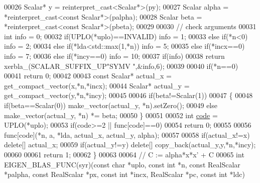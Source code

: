 \begin{DoxyCode}
00026   Scalar* y = \textcolor{keyword}{reinterpret\_cast<}Scalar*\textcolor{keyword}{>}(py);
00027   Scalar alpha  = *\textcolor{keyword}{reinterpret\_cast<}\textcolor{keyword}{const }Scalar*\textcolor{keyword}{>}(palpha);
00028   Scalar beta   = *\textcolor{keyword}{reinterpret\_cast<}\textcolor{keyword}{const }Scalar*\textcolor{keyword}{>}(pbeta);
00029 
00030   \textcolor{comment}{// check arguments}
00031   \textcolor{keywordtype}{int} info = 0;
00032   \textcolor{keywordflow}{if}(UPLO(*uplo)==INVALID)        info = 1;
00033   \textcolor{keywordflow}{else} \textcolor{keywordflow}{if}(*n<0)                   info = 2;
00034   \textcolor{keywordflow}{else} \textcolor{keywordflow}{if}(*lda<std::max(1,*n))    info = 5;
00035   \textcolor{keywordflow}{else} \textcolor{keywordflow}{if}(*incx==0)               info = 7;
00036   \textcolor{keywordflow}{else} \textcolor{keywordflow}{if}(*incy==0)               info = 10;
00037   \textcolor{keywordflow}{if}(info)
00038     \textcolor{keywordflow}{return} xerbla\_(SCALAR\_SUFFIX\_UP\textcolor{stringliteral}{"SYMV "},&info,6);
00039 
00040   \textcolor{keywordflow}{if}(*n==0)
00041     \textcolor{keywordflow}{return} 0;
00042 
00043   \textcolor{keyword}{const} Scalar* actual\_x = get\_compact\_vector(x,*n,*incx);
00044   Scalar* actual\_y = get\_compact\_vector(y,*n,*incy);
00045 
00046   \textcolor{keywordflow}{if}(beta!=Scalar(1))
00047   \{
00048     \textcolor{keywordflow}{if}(beta==Scalar(0)) make\_vector(actual\_y, *n).setZero();
00049     \textcolor{keywordflow}{else}                make\_vector(actual\_y, *n) *= beta;
00050   \}
00051 
00052   \textcolor{keywordtype}{int} \hyperlink{structcode}{code} = UPLO(*uplo);
00053   \textcolor{keywordflow}{if}(code>=2 || func[code]==0)
00054     \textcolor{keywordflow}{return} 0;
00055 
00056   func[code](*n, a, *lda, actual\_x, actual\_y, alpha);
00057 
00058   \textcolor{keywordflow}{if}(actual\_x!=x) \textcolor{keyword}{delete}[] actual\_x;
00059   \textcolor{keywordflow}{if}(actual\_y!=y) \textcolor{keyword}{delete}[] copy\_back(actual\_y,y,*n,*incy);
00060 
00061   \textcolor{keywordflow}{return} 1;
00062 \}
00063 
00064 \textcolor{comment}{// C := alpha*x*x' + C}
00065 \textcolor{keywordtype}{int} EIGEN\_BLAS\_FUNC(syr)(\textcolor{keyword}{const} \textcolor{keywordtype}{char} *uplo, \textcolor{keyword}{const} \textcolor{keywordtype}{int} *n, \textcolor{keyword}{const} RealScalar *palpha, \textcolor{keyword}{const} RealScalar *px, \textcolor{keyword}{
      const} \textcolor{keywordtype}{int} *incx, RealScalar *pc, \textcolor{keyword}{const} \textcolor{keywordtype}{int} *ldc)

\end{DoxyCode}
